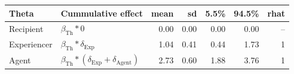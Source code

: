 
\begin{tabular}[t]{llrrrrr}
\toprule
Theta & Cummulative effect & mean & sd & 5.5\% & 94.5\% & rhat\\
\midrule
Recipient & $\beta_{\text{Th}} * 0$ & 0.00 & 0.00 & 0.00 & 0.00 & --\\
Experiencer & $\beta_{\text{Th}} * \delta_{\text{Exp}}$ & 1.04 & 0.41 & 0.44 & 1.73 & 1\\
Agent & $\beta_{\text{Th}} * (\delta_{\text{Exp}} + \delta_{\text{Agent}})$ & 2.73 & 0.60 & 1.88 & 3.76 & 1\\
\bottomrule
\end{tabular}
